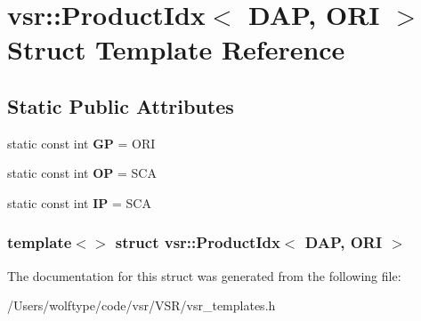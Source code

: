 \hypertarget{structvsr_1_1_product_idx_3_01_d_a_p_00_01_o_r_i_01_4}{\section{vsr\-:\-:Product\-Idx$<$ D\-A\-P, O\-R\-I $>$ Struct Template Reference}
\label{structvsr_1_1_product_idx_3_01_d_a_p_00_01_o_r_i_01_4}
}
\subsection*{Static Public Attributes}
\begin{DoxyCompactItemize}
\item 
\hypertarget{structvsr_1_1_product_idx_3_01_d_a_p_00_01_o_r_i_01_4_a158b8f71d29a66ed281dad6cfc727297}{static const int {\bfseries G\-P} = O\-R\-I}\label{structvsr_1_1_product_idx_3_01_d_a_p_00_01_o_r_i_01_4_a158b8f71d29a66ed281dad6cfc727297}

\item 
\hypertarget{structvsr_1_1_product_idx_3_01_d_a_p_00_01_o_r_i_01_4_ac56e7644eab2409a99053131e94da2dc}{static const int {\bfseries O\-P} = S\-C\-A}\label{structvsr_1_1_product_idx_3_01_d_a_p_00_01_o_r_i_01_4_ac56e7644eab2409a99053131e94da2dc}

\item 
\hypertarget{structvsr_1_1_product_idx_3_01_d_a_p_00_01_o_r_i_01_4_a5e930aa059608c6c27b6a7041d6e156b}{static const int {\bfseries I\-P} = S\-C\-A}\label{structvsr_1_1_product_idx_3_01_d_a_p_00_01_o_r_i_01_4_a5e930aa059608c6c27b6a7041d6e156b}

\end{DoxyCompactItemize}
\subsubsection*{template$<$$>$ struct vsr\-::\-Product\-Idx$<$ D\-A\-P, O\-R\-I $>$}



The documentation for this struct was generated from the following file\-:\begin{DoxyCompactItemize}
\item 
/\-Users/wolftype/code/vsr/\-V\-S\-R/vsr\-\_\-templates.\-h\end{DoxyCompactItemize}
